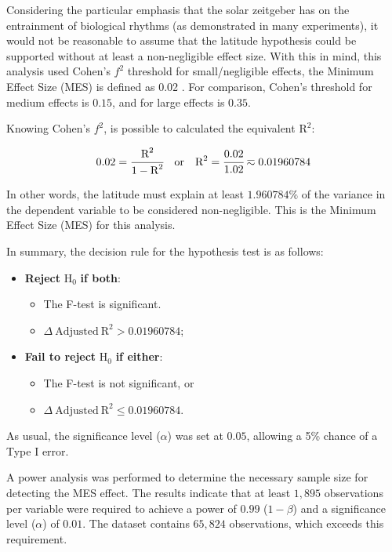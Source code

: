 \documentclass[
12pt,
openright,
oneside,
a4paper,
chapter=TITLE,
section=TITLE,
french,
spanish,
brazil,
english
]{abntex2}
\providecommand{\tightlist}{
\setlength{\itemsep}{0ex}\setlength{\parskip}{0\baselineskip}}
\begin{document}
Considering the particular emphasis that the solar zeitgeber has on the
entrainment of biological rhythms (as demonstrated in many experiments),
it would not be reasonable to assume that the latitude hypothesis could
be supported without at least a non-negligible effect size. With this in
mind, this analysis used Cohen's \(f^{2}\) threshold for
small/negligible effects, the Minimum Effect Size (MES) is defined as
0.02 \autocites[413]{cohen1988}[157]{cohen1992}. For comparison, Cohen's
threshold for medium effects is \(0.15\), and for large effects is
\(0.35\).

Knowing Cohen's \(f^2\), is possible to calculated the equivalent
\(\text{R}^{2}\):

\[
0.02 = \cfrac{\text{R}^{2}}{1 - \text{R}^{2}} \quad \text{or} \quad \text{R}^{2} = \cfrac{0.02}{1.02} \eqsim 0.01960784
\]

In other words, the latitude must explain at least \(1.960784\%\) of the
variance in the dependent variable to be considered non-negligible. This
is the Minimum Effect Size (MES) for this analysis.

In summary, the decision rule for the hypothesis test is as follows:

\begin{itemize}
\tightlist
\item
  \textbf{Reject} \(\text{H}_{0}\) \textbf{if both}:

  \begin{itemize}
  \tightlist
  \item
    The F-test is significant.
  \item
    \(\Delta \ \text{Adjusted} \ \text{R}^{2} > 0.01960784\);
  \end{itemize}
\item
  \textbf{Fail to reject} \(\text{H}_{0}\) \textbf{if either}:

  \begin{itemize}
  \tightlist
  \item
    The F-test is not significant, or
  \item
    \(\Delta \ \text{Adjusted} \ \text{R}^{2} \leq 0.01960784\).
  \end{itemize}
\end{itemize}

As usual, the significance level (\(\alpha\)) was set at \(0.05\),
allowing a 5\% chance of a Type I error.

A power analysis was performed to determine the necessary sample size
for detecting the MES effect. The results indicate that at least
\(1,895\) observations per variable were required to achieve a power of
\(0.99\) (\(1 - \beta\)) and a significance level (\(\alpha\)) of
\(0.01\). The dataset contains \(65,824\) observations, which exceeds
this requirement.
\end{document}

